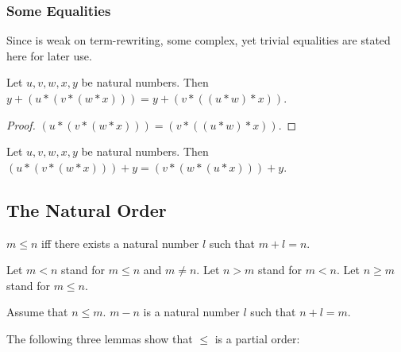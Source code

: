 \documentclass[11pt]{article}
\begin{document}
\subsubsection{Some Equalities}

Since \Naproche is weak on term-rewriting, some complex, yet trivial equalities are stated
here for later use.

\begin{forthel}

\begin{lemma}
Let $u,v,w,x,y$ be natural numbers. 
Then $y + (u * (v * (w * x))) = y + (v * ((u * w) * x))$.
\end{lemma}
\begin{proof}
$(u * (v * (w * x))) = (v * ((u * w) * x))$.
\end{proof}

\begin{lemma}
Let $u,v,w,x,y$ be natural numbers. Then  $(u * (v * (w * x))) + y = (v * (w * (u * x))) + y$.
\end{lemma}


\end{forthel}


\subsection{The Natural Order}

\begin{forthel}

\begin{definition}
$m \leq n$ iff
there exists a natural number $l$ such that $m + l = n$.
\end{definition}

Let $m < n$ stand for $m \leq n$ and $m \neq n$.
Let $n > m$ stand for $m < n$.
Let $n \geq m$ stand for $m \leq n$.


\begin{definition}
Assume that $n \leq m$.
$m - n$ is a natural number $l$ such that $n + l  = m$.
\end{definition}

\end{forthel}

The following three lemmas show that $\leq$ is a partial order:
\end{document}
